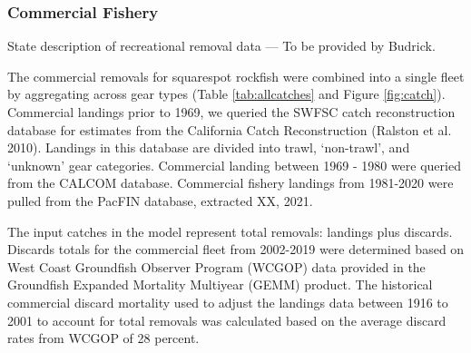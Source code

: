 \documentclass[11pt,
  english,
  a4paper,
]{article}
\begin{document}
\leavevmode\tagmcend\tagstructend


\hypertarget{commercial-fishery}{%
\subsubsection{Commercial Fishery}\label{commercial-fishery}}

\leavevmode\tagmcend\tagstructend


State description of recreational removal data --- To be provided by Budrick.

\leavevmode\tagmcend\tagstructend\par


The commercial removals for squarespot rockfish were combined into a single fleet by aggregating across gear types (Table \ref{tab:allcatches} and Figure \ref{fig:catch}). Commercial landings prior to 1969, we queried the SWFSC catch reconstruction database for estimates from the California Catch Reconstruction {(Ralston et al. 2010)\leavevmode\tagmcend\tagstructend}. Landings in this database are divided into trawl, `non-trawl', and `unknown' gear categories. Commercial landing between 1969 - 1980 were queried from the CALCOM database. Commercial fishery landings from 1981-2020 were pulled from the PacFIN database, extracted XX, 2021.

\leavevmode\tagmcend\tagstructend\par


The input catches in the model represent total removals: landings plus discards. Discards totals for the commercial fleet from 2002-2019 were determined based on West Coast Groundfish Observer Program (WCGOP) data provided in the Groundfish Expanded Mortality Multiyear (GEMM) product. The historical commercial discard mortality used to adjust the landings data between 1916 to 2001 to account for total removals was calculated based on the average discard rates from WCGOP of 28 percent.

\leavevmode\tagmcend\tagstructend\par

\end{document}
